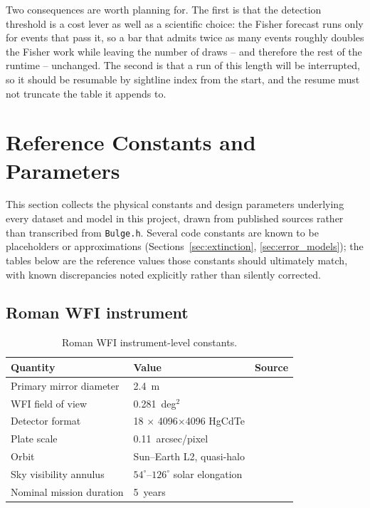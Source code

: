 \documentclass[english,10pt,a4paper]{article}
\begin{document}
	Two consequences are worth planning for. The first is that the detection threshold is a cost lever as well as a scientific choice: the Fisher forecast runs only for events that pass it, so a bar that admits twice as many events roughly doubles the Fisher work while leaving the number of draws -- and therefore the rest of the runtime -- unchanged. The second is that a run of this length will be interrupted, so it should be resumable by sightline index from the start, and the resume must not truncate the table it appends to.

	\section{Reference Constants and Parameters}
	\label{sec:reference_tables}
	
	This section collects the physical constants and design parameters underlying every dataset and model in this project, drawn from published sources rather than transcribed from \texttt{Bulge.h}. Several code constants are known to be placeholders or approximations (Sections~\ref{sec:extinction}, \ref{sec:error_models}); the tables below are the reference values those constants should ultimately match, with known discrepancies noted explicitly rather than silently corrected.
	
	\subsection{Roman WFI instrument}
	
	\begin{table}[htbp]
		\centering
		\begin{tabular}{lll}
			\toprule
			Quantity & Value & Source \\
			\midrule
			Primary mirror diameter & 2.4~m & \cite{RomanMissionOverview} \\
			WFI field of view & 0.281~deg$^2$ & \cite{RomanMissionOverview} \\
			Detector format & 18 $\times$ 4096$\times$4096 HgCdTe & \cite{RomanMissionOverview} \\
			Plate scale & 0.11~arcsec/pixel & \cite{Wang2023RomanFilters} \\
			Orbit & Sun--Earth L2, quasi-halo & \cite{RomanMissionOverview} \\
			Sky visibility annulus & $54^{\circ}$--$126^{\circ}$ solar elongation & \cite{RomanMissionOverview} \\
			Nominal mission duration & 5~years & \cite{RomanMissionOverview} \\
			\bottomrule
		\end{tabular}
		\caption{Roman WFI instrument-level constants.}
		\label{tab:roman_instrument}
	\end{table}
	
\end{document}
